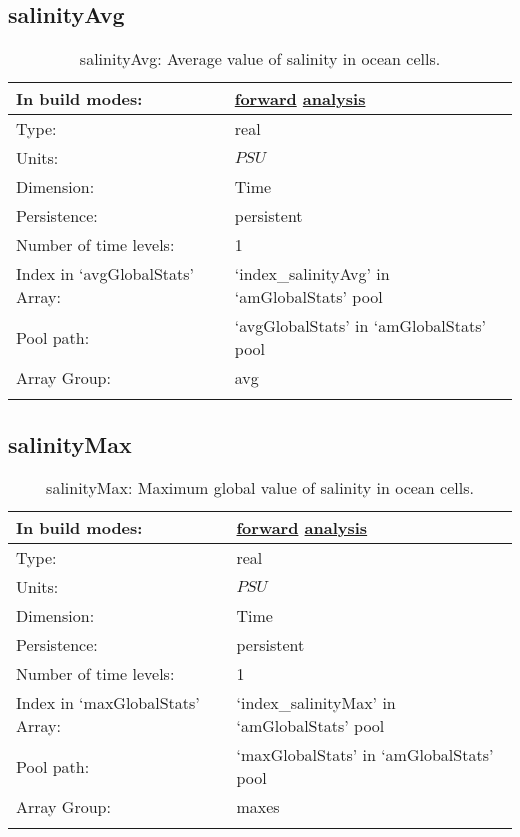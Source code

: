 \subsection[salinityAvg]{salinityAvg}
\label{subsec:var_sec_amGlobalStats_salinityAvg}
\begin{center}
\begin{longtable}{| p{2.0in} | p{4.0in} |}
        \hline 
        In build modes: & \hyperref[subsec:forward_var_tab_amGlobalStats]{forward} \hyperref[subsec:analysis_var_tab_amGlobalStats]{analysis} \\
        \hline 
        Type: & real \\
        \hline 
        Units: & $PSU$ \\
        \hline 
        Dimension: & Time \\
        \hline 
        Persistence: & persistent \\
        \hline 
        Number of time levels: & 1 \\
        \hline 
		 Index in `avgGlobalStats' Array: & `index\_salinityAvg' in `amGlobalStats' pool \\
		 \hline 
            Pool path: & `avgGlobalStats' in `amGlobalStats' pool \\
		 \hline 
		 Array Group: & avg \\
		 \hline 
    \caption{salinityAvg: Average value of salinity in ocean cells.}
\end{longtable}
\end{center}
\subsection[salinityMax]{salinityMax}
\label{subsec:var_sec_amGlobalStats_salinityMax}
\begin{center}
\begin{longtable}{| p{2.0in} | p{4.0in} |}
        \hline 
        In build modes: & \hyperref[subsec:forward_var_tab_amGlobalStats]{forward} \hyperref[subsec:analysis_var_tab_amGlobalStats]{analysis} \\
        \hline 
        Type: & real \\
        \hline 
        Units: & $PSU$ \\
        \hline 
        Dimension: & Time \\
        \hline 
        Persistence: & persistent \\
        \hline 
        Number of time levels: & 1 \\
        \hline 
		 Index in `maxGlobalStats' Array: & `index\_salinityMax' in `amGlobalStats' pool \\
		 \hline 
            Pool path: & `maxGlobalStats' in `amGlobalStats' pool \\
		 \hline 
		 Array Group: & maxes \\
		 \hline 
    \caption{salinityMax: Maximum global value of salinity in ocean cells.}
\end{longtable}
\end{center}

